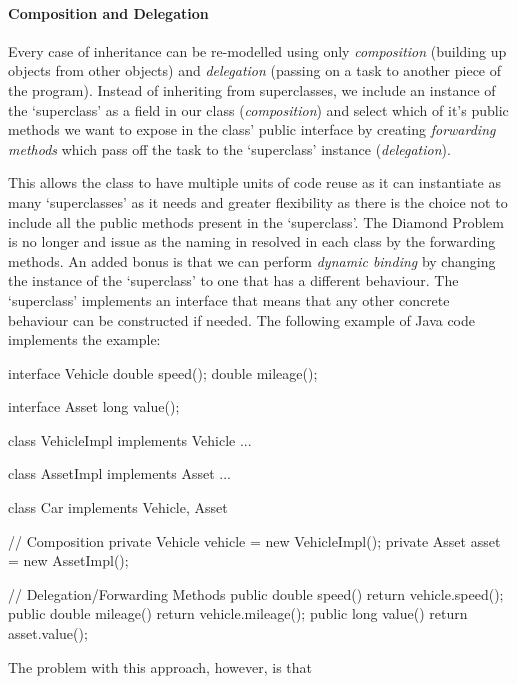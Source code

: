 \documentclass{article}
\newcommand{\bt}{\ensuremath{^{\backprime}}}
\newcommand{\code}[1]{\texttt{\StrSubstitute{#1}{`}{\bt}}}
\newcommand{\bcode}[1]{\code{#1}}
\begin{document}

\paragraph{Composition and Delegation}
\label{sec:CompAndDel}
Every case of inheritance can be re-modelled using only \textit{composition} (building up objects from other objects) and \textit{delegation} (passing on a task to another piece of the program). Instead of inheriting from superclasses, we include an instance of the `superclass' as a field in our class (\textit{composition}) and select which of it's public methods we want to expose in the class' public interface by creating \textit{forwarding methods} which pass off the task to the `superclass' instance (\textit{delegation}).

This allows the class to have multiple units of code reuse as it can instantiate as many `superclasses' as it needs and greater flexibility as there is the choice not to include all the public methods present in the `superclass'. The Diamond Problem is no longer and issue as the naming in resolved in each class by the forwarding methods. An added bonus is that we can perform \textit{dynamic binding} by changing the instance of the `superclass' to one that has a different behaviour. The `superclass' implements an interface that means that any other concrete behaviour can be constructed if needed. The following example of Java code implements the \bcode{Car/Vehicle/Asset} example:
\begin{javalisting}
interface Vehicle {
	double speed();
	double mileage();
}

interface Asset {
	long value();
}

class VehicleImpl implements Vehicle {...}

class AssetImpl implements Asset {...}

class Car implements Vehicle, Asset {
	// Composition
	private Vehicle vehicle = new VehicleImpl();
	private Asset asset = new AssetImpl();

	// Delegation/Forwarding Methods
	public double speed() { return vehicle.speed(); }
	public double mileage() { return vehicle.mileage(); }
	public long value() { return asset.value(); }
}
\end{javalisting}
The problem with this approach, however, is that 
\end{document}
